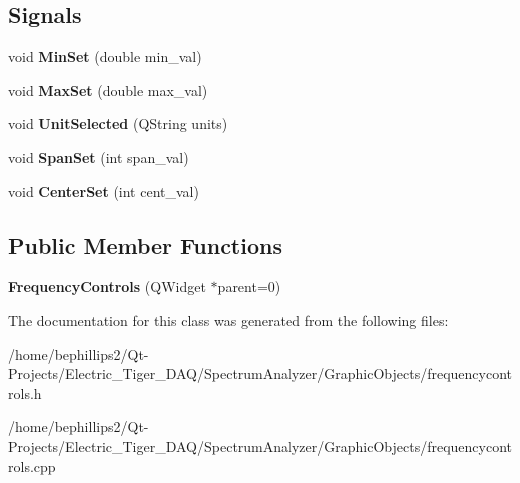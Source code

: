 \subsection*{Signals}
\begin{DoxyCompactItemize}
\item 
void {\bfseries Min\+Set} (double min\+\_\+val)\hypertarget{class_frequency_controls_a3544c74823a7aaabc9a0779ae839eb7f}{}\label{class_frequency_controls_a3544c74823a7aaabc9a0779ae839eb7f}

\item 
void {\bfseries Max\+Set} (double max\+\_\+val)\hypertarget{class_frequency_controls_ad8606de91f4ec71aa8011f658da35a4e}{}\label{class_frequency_controls_ad8606de91f4ec71aa8011f658da35a4e}

\item 
void {\bfseries Unit\+Selected} (Q\+String units)\hypertarget{class_frequency_controls_a5b873965eb03064dbcf713d0c66126d0}{}\label{class_frequency_controls_a5b873965eb03064dbcf713d0c66126d0}

\item 
void {\bfseries Span\+Set} (int span\+\_\+val)\hypertarget{class_frequency_controls_aef534d12777d179c45b59a47c8c1b431}{}\label{class_frequency_controls_aef534d12777d179c45b59a47c8c1b431}

\item 
void {\bfseries Center\+Set} (int cent\+\_\+val)\hypertarget{class_frequency_controls_afd8a0e6ada7b9063e15d55c9c6b562cb}{}\label{class_frequency_controls_afd8a0e6ada7b9063e15d55c9c6b562cb}

\end{DoxyCompactItemize}
\subsection*{Public Member Functions}
\begin{DoxyCompactItemize}
\item 
{\bfseries Frequency\+Controls} (Q\+Widget $\ast$parent=0)\hypertarget{class_frequency_controls_a41928b0575667ca2677e824a0907285b}{}\label{class_frequency_controls_a41928b0575667ca2677e824a0907285b}

\end{DoxyCompactItemize}


The documentation for this class was generated from the following files\+:\begin{DoxyCompactItemize}
\item 
/home/bephillips2/\+Qt-\/\+Projects/\+Electric\+\_\+\+Tiger\+\_\+\+D\+A\+Q/\+Spectrum\+Analyzer/\+Graphic\+Objects/frequencycontrols.\+h\item 
/home/bephillips2/\+Qt-\/\+Projects/\+Electric\+\_\+\+Tiger\+\_\+\+D\+A\+Q/\+Spectrum\+Analyzer/\+Graphic\+Objects/frequencycontrols.\+cpp\end{DoxyCompactItemize}
